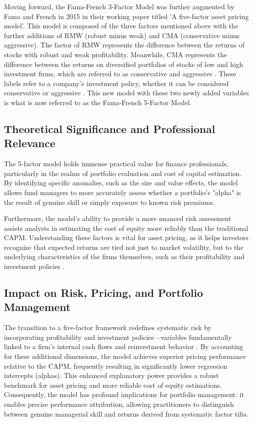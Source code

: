 \documentclass[12pt]{article}
\begin{document}
Moving forward, the Fama-French 3-Factor Model was further augmented by Fama and French in 2015 in their working paper titled 'A five-factor asset pricing model'. This model is composed of the three factors mentioned above with the further additions of RMW (robust minus weak) and CMA (conservative minus aggressive). The factor of RMW represents the difference between the returns of stocks with robust and weak profitability. Meanwhile, CMA represents the difference between the returns on diversified portfolios of stocks of low and high investment firms, which are referred to as conservative and aggressive \parencite{fama2015five}. These labels refer to a company's investment policy, whether it can be considered conservative or aggressive \parencite{MOSOEU202255}. This new model with these two newly added variables is what is now referred to as the Fama-French 5-Factor Model.

\subsection{Theoretical Significance and Professional Relevance}
The 5-factor model holds immense practical value for finance professionals, particularly in the realms of portfolio evaluation and cost of capital estimation. By identifying specific anomalies, such as the size and value effects, the model allows fund managers to more accurately assess whether a portfolio's "alpha" is the result of genuine skill or simply exposure to known risk premiums. 

Furthermore, the model's ability to provide a more nuanced risk assessment assists analysts in estimating the cost of equity more reliably than the traditional CAPM. Understanding these factors is vital for asset pricing, as it helps investors recognize that expected returns are tied not just to market volatility, but to the underlying characteristics of the firms themselves, such as their profitability and investment policies \parencite{fama2015five}.

\subsection{Impact on Risk, Pricing, and Portfolio Management}
The transition to a five-factor framework redefines systematic risk by incorporating profitability and investment policies—variables fundamentally linked to a firm's internal cash flows and reinvestment behavior \parencite{fama2015five}. By accounting for these additional dimensions, the model achieves superior pricing performance relative to the CAPM, frequently resulting in significantly lower regression intercepts (alphas). This enhanced explanatory power provides a robust benchmark for asset pricing and more reliable cost of equity estimations. Consequently, the model has profound implications for portfolio management: it enables precise performance attribution, allowing practitioners to distinguish between genuine managerial skill and returns derived from systematic factor tilts.
\end{document}
